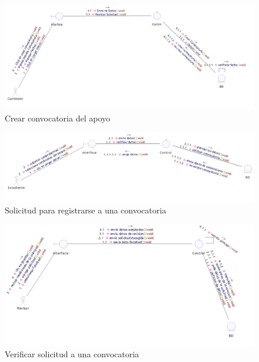 \begin{figure}[th!]
	\centering
	\includegraphics[width=1.4\linewidth]{uml/Comunicacion/ComCreConv}
	\caption{Crear convocatoria del apoyo}
	\label{fig:Crear convocatio del apoyo}
\end{figure}
\clearpage
\begin{figure}[th!]
	\centering
	\includegraphics[width=1.2\linewidth]{uml/Comunicacion/ComSoliConv}
	\caption{Solicitud para registrarse a una convocatoria}
	\label{fig:Solicitud para convocatoria}
\end{figure}

\begin{figure}[th!]
	\centering
	\includegraphics[width=1.2\linewidth]{uml/Comunicacion/ComVer}
	\caption{Verificar solicitud a una convocatoria}
	\label{fig:Verificar solicitud a una convocatoria}
\end{figure}

\clearpage


